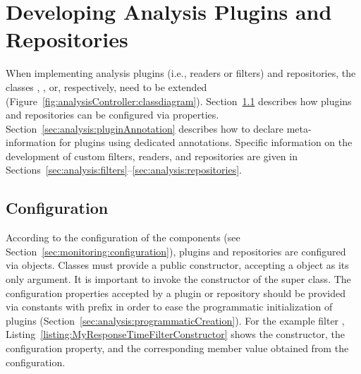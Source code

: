 \section{Developing Analysis Plugins and Repositories}\label{sec:analysis:plugins}

When implementing analysis plugins (i.e., readers or filters) and repositories, %
the classes , , or, %
respectively,  need to be extended %
(Figure~\ref{fig:analysisController:classdiagram}). %
Section~\ref{sec:analysis:configuration} describes how plugins and repositories %
can be configured via properties. %
Section~\ref{sec:analysis:pluginAnnotation} %
describes how to declare meta-information for plugins using %
dedicated annotations. %
Specific information on the development of custom filters, readers, and repositories %
are given in Sections~\ref{sec:analysis:filters}--\ref{sec:analysis:repositories}. %


\subsection{Configuration}\label{sec:analysis:configuration}

\noindent According to the %
configuration of the \KiekerMonitoringPart{} components (see Section~\ref{sec:monitoring:configuration}), 
plugins and repositories are configured via  objects. Classes must %
provide a public constructor, accepting a  object as %
its only argument. It is important to invoke the constructor of the super class. %
The configuration properties accepted by a plugin or repository should be provided via  %
constants with prefix  in order to ease the %
programmatic initialization of plugins (Section~\ref{sec:analysis:programmaticCreation}). %
For the example filter ,
Listing~\ref{listing:MyResponseTimeFilterConstructor} shows the constructor, 
the configuration property, and the corresponding member value obtained from the %
configuration.

